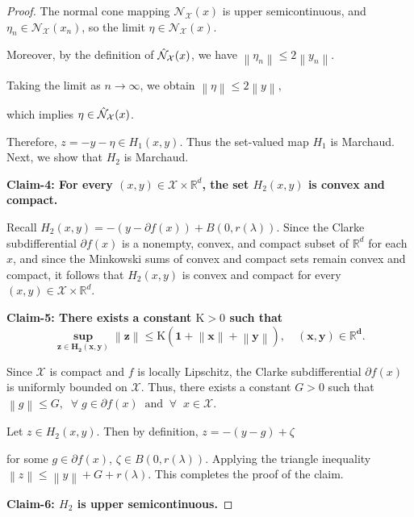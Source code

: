 \documentclass[9pt,journal,twoside,web]{ieeecolor}
\newcommand{\norm}[1]{\left\lVert #1 \right\rVert}
\begin{document}
\begin{proof}
The normal cone mapping $\mathcal{N}_\mathcal{X}(x)$
 is upper semicontinuous, and $\eta_n \in \mathcal{N}_\mathcal{X}(x_n)$, so the limit $\eta \in \mathcal{N}_\mathcal{X}(x)$.

Moreover, by the definition of $\Hat{\mathcal{N}}_\mathcal{X}(x)$, we have $\norm{\eta_n} \leq 2 \norm{y_n}$.

Taking the limit as $n \to \infty$, we obtain $\norm{\eta} \leq 2 \norm{y},$

which implies $\eta \in \Hat{\mathcal{N}}_\mathcal{X}(x)$. 

Therefore, $  z = -y-\eta \in H_1(x,y).$
Thus the set-valued map $H_1$ is Marchaud. 
Next, we show that $H_2$ is Marchaud.

\textbf{Claim-4: For every $(x,y) \in \mathcal{X} \times \mathbb{R}^d$, the set $H_2(x,y)$ is convex and compact.}

Recall $  H_2(x,y)  = -( y- \partial  f(x) ) + B(0,r(\lambda))$.
Since the Clarke subdifferential $\partial f(x)$
 is a nonempty, convex, and compact subset of $\mathbb{R}^d$ for each 
$x$, and since the Minkowski sums of convex and  compact sets remain convex and compact, it follows that
 $H_2(x,y)$ is convex and compact for every $(x,y) \in \mathcal{X} \times \mathbb{R}^d$. 


 \textbf{Claim-5: There exists a constant $\mathrm{K} > 0$ such that 
        \begin{equation*}
           \mathbf{ \sup\limits_{z \in H_2(x,y)} \norm{z} \leq \mathrm{K} (1 + \norm{x} + \norm{y}), \quad (x,y) \in \mathbb{R}^d.}
        \end{equation*}}

        Since $\mathcal{X}$
  is compact and $f$ is locally Lipschitz, the Clarke subdifferential 
$\partial f(x)$ is uniformly bounded on 
$\mathcal{X}$. Thus, there exists a constant 
$G> 0$ such that $ \norm{g} \leq G, \; \; \forall \; g \in \partial f(x) \; \; \text{and} \; \; \forall \; \; x \in \mathcal{X}.$

Let $z \in H_2(x,y)$. Then by definition,  $ z = -(y-g) + \zeta$

for some $g \in \partial f(x)$, $\zeta \in B (0,r(\lambda))$. Applying the triangle inequality $ \norm{z} \leq \norm{y} + G + r(\lambda).$
        This completes the proof of the claim.

        \textbf{Claim-6: $H_2$ is upper semicontinuous.}


\end{proof}
\end{document}
